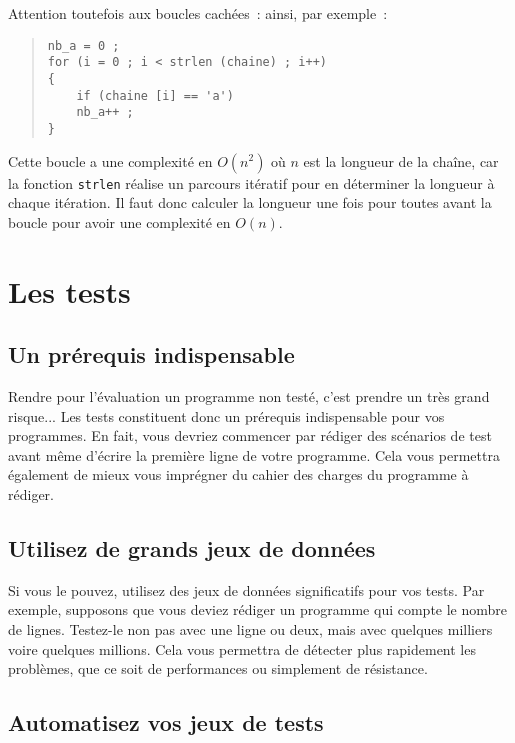 \documentclass {article}
\begin{document}
Attention toutefois aux boucles cachées~: ainsi, par exemple~:

\begin {quote}
\begin {lstlisting}
nb_a = 0 ;
for (i = 0 ; i < strlen (chaine) ; i++)
{
    if (chaine [i] == 'a')
	nb_a++ ;
}
\end{lstlisting}
\end {quote}

Cette boucle a une complexité en $O(n^2)$ où $n$ est la longueur de la
chaîne, car la fonction \texttt {strlen} réalise un parcours itératif
pour en déterminer la longueur à chaque itération. Il faut donc
calculer la longueur une fois pour toutes avant la boucle pour avoir
une complexité en $O(n)$.


\section {Les tests}

\subsection {Un prérequis indispensable}

Rendre pour l'évaluation un programme non testé, c'est prendre un très
grand risque... Les tests constituent donc un prérequis indispensable
pour vos programmes. En fait, vous devriez commencer par rédiger des
scénarios de test avant même d'écrire la première ligne de votre
programme. Cela vous permettra également de mieux vous imprégner du
cahier des charges du programme à rédiger.

\subsection {Utilisez de grands jeux de données}

Si vous le pouvez, utilisez des jeux de données significatifs pour vos
tests. Par exemple, supposons que vous deviez rédiger un programme qui
compte le nombre de lignes. Testez-le non pas avec une ligne ou deux,
mais avec quelques milliers voire quelques millions. Cela vous permettra
de détecter plus rapidement les problèmes, que ce soit de performances
ou simplement de résistance.


\subsection {Automatisez vos jeux de tests}
\end{document}

